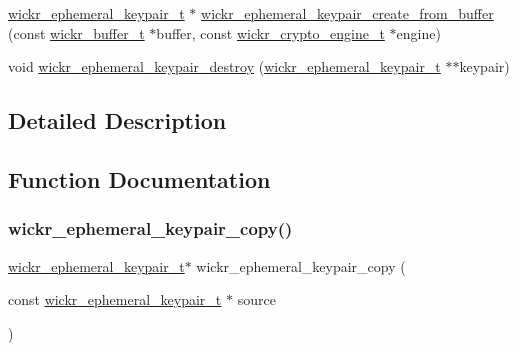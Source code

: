 \begin{DoxyCompactItemize}
\item 
\mbox{\hyperlink{structwickr__ephemeral__keypair}{wickr\+\_\+ephemeral\+\_\+keypair\+\_\+t}} $\ast$ \mbox{\hyperlink{group__wickr__ephemeral__keypair_ga7ecd3769c68ba5bfbc95a225c1021ed0}{wickr\+\_\+ephemeral\+\_\+keypair\+\_\+create\+\_\+from\+\_\+buffer}} (const \mbox{\hyperlink{structwickr__buffer}{wickr\+\_\+buffer\+\_\+t}} $\ast$buffer, const \mbox{\hyperlink{structwickr__crypto__engine}{wickr\+\_\+crypto\+\_\+engine\+\_\+t}} $\ast$engine)
\item 
void \mbox{\hyperlink{group__wickr__ephemeral__keypair_gab77107c0b1a0d145c606817eeecec63d}{wickr\+\_\+ephemeral\+\_\+keypair\+\_\+destroy}} (\mbox{\hyperlink{structwickr__ephemeral__keypair}{wickr\+\_\+ephemeral\+\_\+keypair\+\_\+t}} $\ast$$\ast$keypair)
\end{DoxyCompactItemize}


\subsection{Detailed Description}


\subsection{Function Documentation}
\mbox{\label{group__wickr__ephemeral__keypair_gacf14f050221091093b9a2948bd569662}} 
\subsubsection{\texorpdfstring{wickr\+\_\+ephemeral\+\_\+keypair\+\_\+copy()}{wickr\_ephemeral\_keypair\_copy()}}
{\footnotesize\ttfamily \mbox{\hyperlink{structwickr__ephemeral__keypair}{wickr\+\_\+ephemeral\+\_\+keypair\+\_\+t}}$\ast$ wickr\+\_\+ephemeral\+\_\+keypair\+\_\+copy (\begin{DoxyParamCaption}\item[{const \mbox{\hyperlink{structwickr__ephemeral__keypair}{wickr\+\_\+ephemeral\+\_\+keypair\+\_\+t}} $\ast$}]{source }\end{DoxyParamCaption})}

